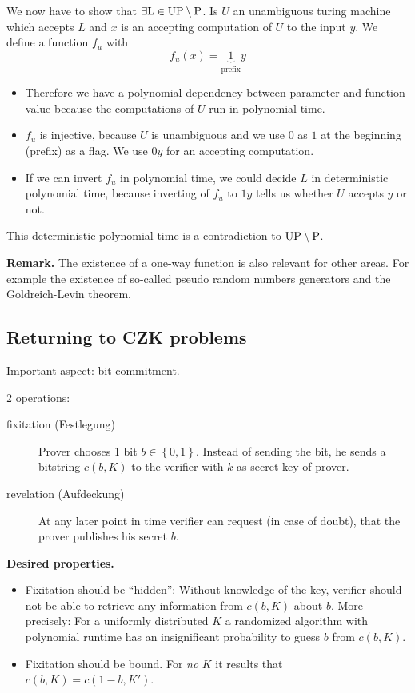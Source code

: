 \documentclass[a4paper]{article}
\newcommand{\cls}[1]{\rm{#1}}
\newcommand{\set}[1]{\left\{#1\right\}}
\begin{document}
We now have to show that $\exists \cls{L} \in \cls{UP} \setminus \cls{P}$.
Is $U$ an unambiguous turing machine which accepts $L$ and $x$ is an
accepting computation of $U$ to the input $y$. We define a function $f_u$
with
\[
  f_u(x) = \underbrace{1}_{\text{prefix}}y
\]
\begin{itemize}
  \item Therefore we have a polynomial dependency between parameter and function
        value because the computations of $U$ run in polynomial time.
  \item $f_u$ is injective, because $U$ is unambiguous and we use $0$ as $1$
        at the beginning (prefix) as a flag.
        We use $0y$ for an accepting computation.
  \item If we can invert $f_u$ in polynomial time, we could decide $L$ in
        deterministic polynomial time, because inverting of $f_u$
        to $1y$ tells us whether $U$ accepts $y$ or not.
\end{itemize}

This deterministic polynomial time is a contradiction to $\cls{UP} \setminus
\cls{P}$.

\textbf{Remark.} The existence of a one-way function is also relevant for other
areas. For example the existence of so-called pseudo random numbers generators
and the Goldreich-Levin theorem.

\subsection{Returning to CZK problems}
%
Important aspect: bit commitment.

2 operations:
\begin{description}
  \item[fixitation (Festlegung)]
    Prover chooses 1 bit $b \in \set{0,1}$. Instead of sending
    the bit, he sends a bitstring $c(b, K)$ to the verifier with $k$
    as secret key of prover.
  \item[revelation (Aufdeckung)]
    At any later point in time verifier can request (in case of doubt),
    that the prover publishes his secret $b$.
\end{description}

\textbf{Desired properties.}
\begin{itemize}
  \item
    Fixitation should be ``hidden'': Without knowledge of the key, verifier should
    not be able to retrieve any information from $c(b, K)$ about $b$.
    More precisely: For a uniformly distributed $K$ a randomized algorithm with
    polynomial runtime has an insignificant probability to guess $b$ from $c(b, K)$.
  \item
    Fixitation should be bound. For \emph{no} $K$ it results that $c(b, K) = c(1-b, K')$.
\end{itemize}
\end{document}
